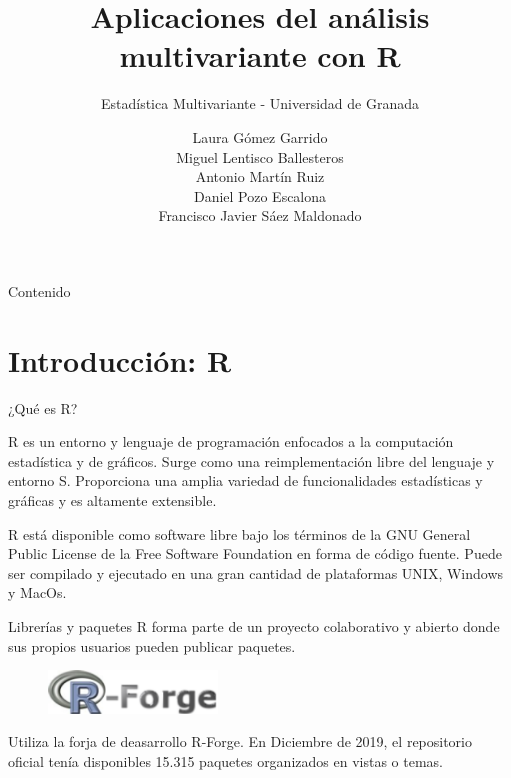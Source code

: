 \documentclass[xcolor=table]{beamer}
\title{Aplicaciones del análisis multivariante con R}
\subtitle{Estadística Multivariante - Universidad de Granada}
\author{Laura Gómez Garrido\\ Miguel Lentisco Ballesteros \\ Antonio Martín Ruiz \\ Daniel Pozo Escalona \\Francisco Javier Sáez Maldonado}
\begin{document}
\begin{frame}
\titlepage
\end{frame}
\begin{frame}{Contenido}
  \tableofcontents
\end{frame}
\section{Introducción: R}

\begin{frame}{¿Qué es R?}

R es un entorno y lenguaje de programación enfocados a la computación
estadística y de gráficos. Surge como una reimplementación libre del lenguaje y
entorno S. Proporciona una amplia variedad de funcionalidades estadísticas y
gráficas y es altamente extensible.

\end{frame}

\begin{frame}
  
R está disponible como software libre bajo los términos de la GNU General Public
License de la Free Software Foundation en forma de código fuente. Puede ser
compilado y ejecutado en una gran cantidad de plataformas UNIX, Windows y MacOs.

\end{frame}

\begin{frame}{Librerías y paquetes}
R forma parte de un proyecto colaborativo y abierto donde sus propios usuarios pueden publicar paquetes.
\newline
\newline
\begin{figure}
\centering
\includegraphics[width=0.4\textwidth]{r-forge.png}
\end{figure}
{Utiliza la forja de deasarrollo R-Forge.}
\newline
\newline
{En Diciembre de 2019, el repositorio oficial tenía disponibles 15.315 paquetes organizados en vistas o temas. }
\end{frame}
\end{document}
